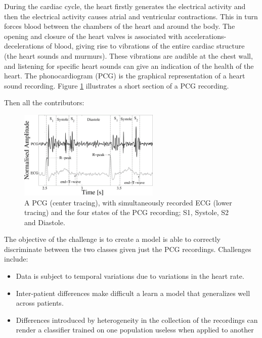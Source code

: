 \documentclass{project-logbook}
\begin{document}
During the cardiac cycle, the heart firstly generates the electrical activity and then the electrical activity causes atrial and ventricular contractions. This in turn forces blood between the chambers of the heart and around the body. The opening and closure of the heart valves is associated with accelerations-decelerations of blood, giving rise to vibrations of the entire cardiac structure (the heart sounds and murmurs). These vibrations are audible at the chest wall, and listening for specific heart sounds can give an indication of the health of the heart. The phonocardiogram (PCG) is the graphical representation of a heart sound recording. Figure \ref{fig:PCG_ECG} illustrates a short section of a PCG recording.

Then all the contributors: {

\begin{figure}[h]
    \includegraphics[width=0.6\textwidth]{figures/PCG_ECG}
    \centering
    \caption{A PCG (center tracing), with simultaneously recorded ECG (lower tracing) and the four states of the PCG recording; S1, Systole, S2 and Diastole.}
    \label{fig:PCG_ECG}
\end{figure}

The objective of the challenge is to create a model is able to correctly discriminate between the two classes given just the PCG recordings. Challenges include:

\begin{itemize}
    \item Data is subject to temporal variations due to variations in the heart rate.
    \item Inter-patient differences make difficult a learn a model that generalizes well across patients.
    \item Differences introduced by heterogeneity in the collection of the recordings can render a classifier trained on one population useless when applied to another
\end{itemize}

}
\end{document}
